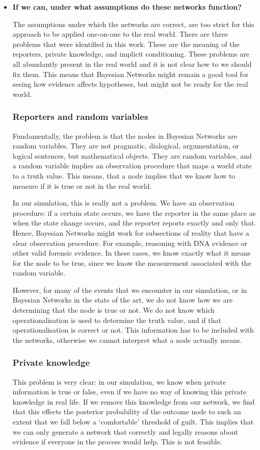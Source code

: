 \begin{itemize}
\item \textbf{If we can, under what assumptions do these networks function?}

The assumptions under which the networks are correct, are too strict for this approach to be applied one-on-one to the real world. There are three problems that were identified in this work. These are the meaning of the reporters, private knowledge, and implicit conditioning. These problems are all abundantly present in the real world and it is not clear how to we should fix them. This means that Bayesian Networks might remain a good tool for seeing how evidence affects hypotheses, but might not be ready for the real world.


\subsubsection{Reporters and random variables}

Fundamentally, the problem is that the nodes in Bayesian Networks are random variables. They are not pragmatic, dialogical, argumentation, or logical sentences, but mathematical objects. They are random variables, and a random variable implies an observation procedure that maps a world state to a truth value. This means, that a node implies that we know how to measure if it is true or not in the real world.

In our simulation, this is really not a problem. We have an observation procedure: if a certain state occurs, we have the reporter in the same place as when the state change occurs, and the reporter reports exactly and only that. Hence, Bayesian Networks might work for subsections of reality that have a clear observation procedure. For example, reasoning with DNA evidence or other valid forensic evidence. In these cases, we know exactly what it means for the node to be true, since we know the measurement associated with the random variable.
 
However, for many of the events that we encounter in our simulation, or in Bayesian Networks in the state of the art, we do not know how we are determining that the node is true or not. We do not know which operationalisation is used to determine the truth value, and if that operationalisation is correct or not. This information has to be included with the networks, otherwise we cannot interpret what a node actually means. 

\subsubsection{Private knowledge}
This problem is very clear: in our simulation, we know when private information is true or false, even if we have no way of knowing this private knowledge in real life. If we remove this knowledge from our network, we find that this effects the posterior probability of the outcome node to such an extent that we fall below a `comfortable' threshold of guilt. This implies that we can only generate a network that correctly and legally reasons about evidence if everyone in the process would help. This is not feasible.



\end{itemize}
